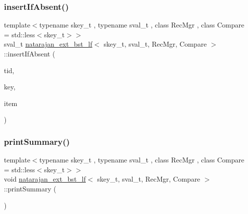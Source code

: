 \mbox{\label{classnatarajan__ext__bst__lf_acee96bf831b747c5c9c2541c5101f506}} 
\subsubsection{\texorpdfstring{insert\+If\+Absent()}{insertIfAbsent()}\hspace{0.1cm}{\footnotesize\ttfamily [2/2]}}
{\footnotesize\ttfamily template$<$typename skey\+\_\+t , typename sval\+\_\+t , class Rec\+Mgr , class Compare  = std\+::less$<$skey\+\_\+t$>$$>$ \\
sval\+\_\+t \hyperlink{classnatarajan__ext__bst__lf}{natarajan\+\_\+ext\+\_\+bst\+\_\+lf}$<$ skey\+\_\+t, sval\+\_\+t, Rec\+Mgr, Compare $>$\+::insert\+If\+Absent (\begin{DoxyParamCaption}\item[{const int}]{tid,  }\item[{skey\+\_\+t}]{key,  }\item[{sval\+\_\+t}]{item }\end{DoxyParamCaption})\hspace{0.3cm}{\ttfamily [inline]}}

\mbox{\label{classnatarajan__ext__bst__lf_a4d041c7fc819e57286e1907757a68895}} 
\subsubsection{\texorpdfstring{print\+Summary()}{printSummary()}\hspace{0.1cm}{\footnotesize\ttfamily [1/2]}}
{\footnotesize\ttfamily template$<$typename skey\+\_\+t , typename sval\+\_\+t , class Rec\+Mgr , class Compare  = std\+::less$<$skey\+\_\+t$>$$>$ \\
void \hyperlink{classnatarajan__ext__bst__lf}{natarajan\+\_\+ext\+\_\+bst\+\_\+lf}$<$ skey\+\_\+t, sval\+\_\+t, Rec\+Mgr, Compare $>$\+::print\+Summary (\begin{DoxyParamCaption}{ }\end{DoxyParamCaption})\hspace{0.3cm}{\ttfamily [inline]}}

